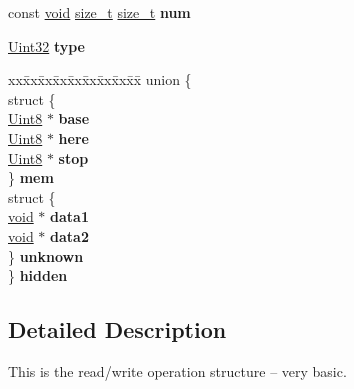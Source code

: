 \begin{DoxyCompactItemize}
\item 
\hypertarget{struct_s_d_l___r_wops_a630921d5c84cf48a4a10f9a75e1caa10}{}const \hyperlink{_s_d_l__audio_8h_a52835ae37c4bb905b903cbaf5d04b05f}{void} \hyperlink{struct_s_d_l___r_wops_acd9a3c6e840d285c1e30cadaf99097b2}{size\+\_\+t} \hyperlink{struct_s_d_l___r_wops_acd9a3c6e840d285c1e30cadaf99097b2}{size\+\_\+t} {\bfseries num}\label{struct_s_d_l___r_wops_a630921d5c84cf48a4a10f9a75e1caa10}

\item 
\hypertarget{struct_s_d_l___r_wops_a099017bfceaac24ced0e4d08a4e0a023}{}\hyperlink{_s_d_l__stdinc_8h_add440eff171ea5f55cb00c4a9ab8672d}{Uint32} {\bfseries type}\label{struct_s_d_l___r_wops_a099017bfceaac24ced0e4d08a4e0a023}

\item 
\hypertarget{struct_s_d_l___r_wops_a3581e612176be5abb50ca3c1040ce12a}{}\begin{tabbing}
xx\=xx\=xx\=xx\=xx\=xx\=xx\=xx\=xx\=\kill
union \{\\
\>struct \{\\
\>\>\hyperlink{_s_d_l__stdinc_8h_a2944638813a090aa23e62f4da842c3e2}{Uint8} $\ast$ {\bfseries base}\\
\>\>\hyperlink{_s_d_l__stdinc_8h_a2944638813a090aa23e62f4da842c3e2}{Uint8} $\ast$ {\bfseries here}\\
\>\>\hyperlink{_s_d_l__stdinc_8h_a2944638813a090aa23e62f4da842c3e2}{Uint8} $\ast$ {\bfseries stop}\\
\>\} {\bfseries mem}\\
\>struct \{\\
\>\>\hyperlink{_s_d_l__audio_8h_a52835ae37c4bb905b903cbaf5d04b05f}{void} $\ast$ {\bfseries data1}\\
\>\>\hyperlink{_s_d_l__audio_8h_a52835ae37c4bb905b903cbaf5d04b05f}{void} $\ast$ {\bfseries data2}\\
\>\} {\bfseries unknown}\\
\} {\bfseries hidden}\label{struct_s_d_l___r_wops_a3581e612176be5abb50ca3c1040ce12a}
\\

\end{tabbing}\end{DoxyCompactItemize}


\subsection{Detailed Description}
This is the read/write operation structure -- very basic. 

